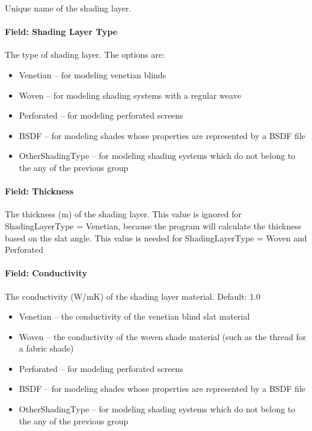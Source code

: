 Unique name of the shading layer.

\paragraph{Field: Shading Layer Type}\label{field-shading-layer-type}

The type of shading layer. The options are:

\begin{itemize}
\item
  Venetian -- for modeling venetian blinds
\item
  Woven -- for modeling shading systems with a regular weave
\item
  Perforated -- for modeling perforated screens
\item
  BSDF -- for modeling shades whose properties are represented by a BSDF file
\item
  OtherShadingType -- for modeling shading systems which do not belong to the any of the previous group
\end{itemize}

\paragraph{Field: Thickness}\label{field-thickness-7}

The thickness (m) of the shading layer. This value is ignored for ShadingLayerType = Venetian, because the program will calculate the thickness based on the slat angle. This value is needed for ShadingLayerType = Woven and Perforated

\paragraph{Field: Conductivity}\label{field-conductivity-4}

The conductivity (W/mK) of the shading layer material. Default: 1.0

\begin{itemize}
\item
  Venetian -- the conductivity of the venetian blind slat material
\item
  Woven -- the conductivity of the woven shade material (such as the thread for a fabric shade)
\item
  Perforated -- for modeling perforated screens
\item
  BSDF -- for modeling shades whose properties are represented by a BSDF file
\item
  OtherShadingType -- for modeling shading systems which do not belong to the any of the previous group
\end{itemize}

